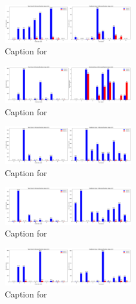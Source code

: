 \documentclass[12pt, a4paper]{article}
\begin{document}
\begin{figure}[ht]
\centering
\includegraphics[width=0.5\textwidth]{combined_class_boundary_pgd/combined_class_9_misclassifications_eps_0.4.png}
\caption{Caption for }
\label{fig:combined_class_9_misclassifications_eps_0.4.png}
\end{figure}



\begin{figure}[ht]
\centering
\includegraphics[width=0.5\textwidth]{combined_class_boundary_pgd/combined_class_0_misclassifications_eps_0.5.png}
\caption{Caption for }
\label{fig:combined_class_0_misclassifications_eps_0.5.png}
\end{figure}

\begin{figure}[ht]
\centering
\includegraphics[width=0.5\textwidth]{combined_class_boundary_pgd/combined_class_1_misclassifications_eps_0.5.png}
\caption{Caption for }
\label{fig:combined_class_1_misclassifications_eps_0.5.png}
\end{figure}

\begin{figure}[ht]
\centering
\includegraphics[width=0.5\textwidth]{combined_class_boundary_pgd/combined_class_2_misclassifications_eps_0.5.png}
\caption{Caption for }
\label{fig:combined_class_2_misclassifications_eps_0.5.png}
\end{figure}

\begin{figure}[ht]
\centering
\includegraphics[width=0.5\textwidth]{combined_class_boundary_pgd/combined_class_3_misclassifications_eps_0.5.png}
\caption{Caption for }
\label{fig:combined_class_3_misclassifications_eps_0.5.png}
\end{figure}
\end{document}
